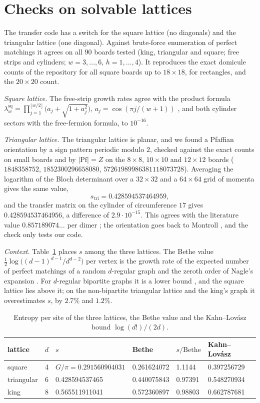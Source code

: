 \documentclass[11pt]{amsart}
\theoremstyle{definition}
\theoremstyle{remark}
\begin{document}
\section{Checks on solvable lattices}\label{sec:checks}
The transfer code has a switch for the square lattice (no diagonals) and the triangular lattice
(one diagonal). Against brute-force enumeration of perfect matchings it agrees on all $90$ boards
tested (king, triangular and square; free strips and cylinders; $w = 3, \dots, 6$, $h = 1, \dots, 4$).
It reproduces the exact domicule counts of the repository for all square boards up to
$18\times18$, for rectangles, and the $20\times20$ count.

\emph{Square lattice.} The free-strip growth rates agree with the product formula
$\lambda^{\mathrm{sq}}_w = \prod_{j=1}^{\lfloor w/2 \rfloor} \bigl(a_j + \sqrt{1 + a_j^2}\bigr)$,
$a_j = \cos(\pi j/(w+1))$ \cite{kasteleyn1961}, and both cylinder sectors with the free-fermion
formula, to $10^{-16}$.

\emph{Triangular lattice.} The triangular lattice is planar, and we found a Pfaffian orientation
by a sign pattern periodic modulo $2$, checked against the exact counts on small boards and by
$|\mathrm{Pf}| = Z$ on the $8\times8$, $10\times10$ and $12\times12$ boards ($1848358752$,
$1852300296658080$, $57261989986381118073728$). Averaging the logarithm of the Bloch determinant
over a $32\times32$ and a $64\times64$ grid of momenta gives the same value,
\[
  s_{\mathrm{tri}} = 0.428594537464959,
\]
and the transfer matrix on the cylinder of circumference $17$ gives $0.428594537464956$, a
difference of $2.9\cdot10^{-15}$. This agrees with the literature value $0.857189074\ldots$ per
dimer \cite{wu2006}; the orientation goes back to Montroll \cite{montroll1964}, and the check only
tests our code.

\emph{Context.} Table~\ref{tab:context} places $s$ among the three lattices. The Bethe value
$\frac12\log\bigl((d-1)^{d-1}/d^{d-2}\bigr)$ per vertex is the growth rate of the expected number of
perfect matchings of a random $d$-regular graph \cite{bollobasmckay1986} and the zeroth order of
Nagle's expansion \cite{nagle1966}. For $d$-regular bipartite graphs it is a lower bound
\cite{schrijver1998}, and the square lattice lies above it; on the non-bipartite triangular
lattice and the king's graph it overestimates $s$, by $2.7\%$ and $1.2\%$.

\begin{table}[ht]
\caption{Entropy per site of the three lattices, the Bethe value and the Kahn--Lov\'asz bound
$\log(d!)/(2d)$.}\label{tab:context}
\begin{tabular}{lrllll}
\toprule
lattice & $d$ & $s$ & Bethe & $s/\text{Bethe}$ & Kahn--Lov\'asz \\
\midrule
square     & 4 & $G/\pi = 0.291560904031$ & 0.261624072 & 1.1144  & 0.397256729 \\
triangular & 6 & 0.428594537465            & 0.440075843 & 0.97391 & 0.548270934 \\
king       & 8 & 0.565511911041            & 0.572360897 & 0.98803 & 0.662787681 \\
\bottomrule
\end{tabular}
\end{table}
\end{document}
